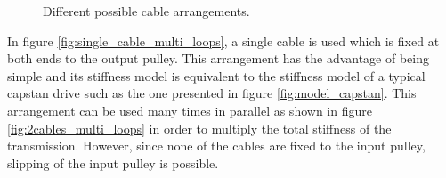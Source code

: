 \begin{figure}
    \hspace{0.1\textwidth}
    \caption{Different possible cable arrangements.}
    \label{fig:cable_arrangements}
\end{figure}
In figure \ref{fig:single_cable_multi_loops}, a single cable is used which is fixed at both ends to the output pulley. This arrangement has the advantage of being simple and its stiffness model is equivalent to the stiffness model of a typical capstan drive such as the one presented in figure \ref{fig:model_capstan}. This arrangement can be used many times in parallel as shown in figure \ref{fig:2cables_multi_loops} in order to multiply the total stiffness of the transmission. However, since none of the cables are fixed to the input pulley, slipping of the input pulley is possible.\\

